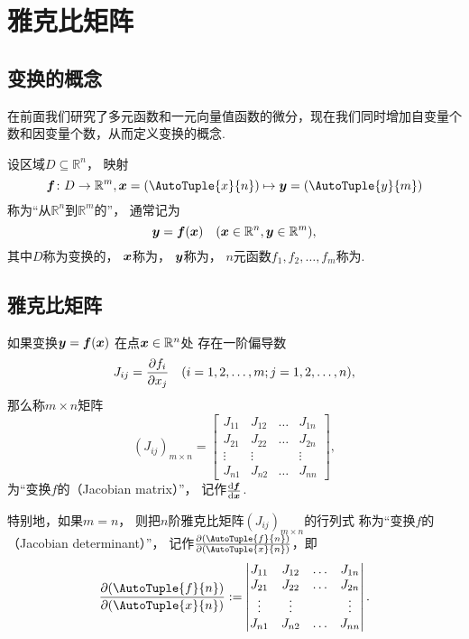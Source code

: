 \section{雅克比矩阵}
\subsection{变换的概念}
在前面我们研究了多元函数和一元向量值函数的微分，现在我们同时增加自变量个数和因变量个数，从而定义变换的概念.
\begin{definition}
设区域\(D \subseteq \mathbb{R}^n\)，
映射\[
	\vb{f}\colon D \to \mathbb{R}^m,
		\vb{x}=(\AutoTuple{x}{n})
		\mapsto\vb{y}=(\AutoTuple{y}{m})
\]
称为“从\(\mathbb{R}^n\)到\(\mathbb{R}^m\)的”，
通常记为\[
	\boldsymbol{y} = \boldsymbol{f}(\boldsymbol{x})
	\quad(\boldsymbol{x}\in\mathbb{R}^n,\boldsymbol{y}\in\mathbb{R}^m),
\]
其中\(D\)称为变换的，
\(\boldsymbol{x}\)称为，
\(\boldsymbol{y}\)称为，
\(n\)元函数\(f_1,f_2,\dotsc,f_m\)称为.
\end{definition}

\subsection{雅克比矩阵}
\begin{definition}
如果变换\(\boldsymbol{y} = \boldsymbol{f}(\boldsymbol{x})\)
在点\(\boldsymbol{x} \in \mathbb{R}^n\)处
存在一阶偏导数\[
	J_{ij} = \pdv{f_i}{x_j}
	\quad(i=1,2,\dotsc,m; j=1,2,\dotsc,n),
\]
那么称\(m \times n\)矩阵\[
	(J_{ij})_{m \times n}
	= \begin{bmatrix}
		J_{11} & J_{12} & \dots & J_{1n} \\
		J_{21} & J_{22} & \dots & J_{2n} \\
		\vdots & \vdots & & \vdots \\
		J_{n1} & J_{n2} & \dots & J_{nn}
	\end{bmatrix},
\]为“变换\(f\)的（Jacobian matrix）”，
记作\(\dv{\boldsymbol{f}}{\boldsymbol{x}}\).

特别地，如果\(m = n\)，
则把\(n\)阶雅克比矩阵\((J_{ij})_{m \times n}\)的行列式
称为“变换\(f\)的（Jacobian determinant）”，
记作\(\jacobi{\AutoTuple{f}{n}}{\AutoTuple{x}{n}}\)，即\[
	\jacobi{\AutoTuple{f}{n}}{\AutoTuple{x}{n}}
	\defeq \begin{vmatrix}
		J_{11} & J_{12} & \dots & J_{1n} \\
		J_{21} & J_{22} & \dots & J_{2n} \\
		\vdots & \vdots & & \vdots \\
		J_{n1} & J_{n2} & \dots & J_{nn}
	\end{vmatrix}.
\]
\end{definition}

